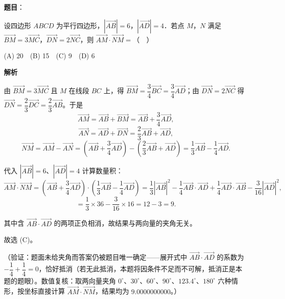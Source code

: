\begin{answer}

\textbf{题目}：

设四边形 \(ABCD\) 为平行四边形，\(\left|\overrightarrow{AB}\right|=6\)，\(\left|\overrightarrow{AD}\right|=4\)．若点 \(M\)，\(N\) 满足 \(\overrightarrow{BM}=3\overrightarrow{MC}\)，\(\overrightarrow{DN}=2\overrightarrow{NC}\)，则 \(\overrightarrow{AM}\cdot\overrightarrow{NM}=\)（　）

(A) 20　(B) 15　(C) 9　(D) 6

\textbf{解析}

由 \(\overrightarrow{BM}=3\overrightarrow{MC}\) 且 \(M\) 在线段 \(BC\) 上，得 \(\overrightarrow{BM}=\dfrac{3}{4}\overrightarrow{BC}=\dfrac{3}{4}\overrightarrow{AD}\)；由 \(\overrightarrow{DN}=2\overrightarrow{NC}\) 得 \(\overrightarrow{DN}=\dfrac{2}{3}\overrightarrow{DC}=\dfrac{2}{3}\overrightarrow{AB}\)。于是
\nopagebreak[4]
\[
\overrightarrow{AM}=\overrightarrow{AB}+\overrightarrow{BM}=\overrightarrow{AB}+\dfrac{3}{4}\overrightarrow{AD},
\]
\nopagebreak[4]
\[
\overrightarrow{AN}=\overrightarrow{AD}+\overrightarrow{DN}=\dfrac{2}{3}\overrightarrow{AB}+\overrightarrow{AD},
\]
\nopagebreak[4]
\[
\overrightarrow{NM}=\overrightarrow{AM}-\overrightarrow{AN}=\left(\overrightarrow{AB}+\dfrac{3}{4}\overrightarrow{AD}\right)-\left(\dfrac{2}{3}\overrightarrow{AB}+\overrightarrow{AD}\right)=\dfrac{1}{3}\overrightarrow{AB}-\dfrac{1}{4}\overrightarrow{AD}.
\]

代入 \(\left|\overrightarrow{AB}\right|=6\)、\(\left|\overrightarrow{AD}\right|=4\) 计算数量积：
\nopagebreak[4]
\[
\overrightarrow{AM}\cdot\overrightarrow{NM}=\left(\overrightarrow{AB}+\dfrac{3}{4}\overrightarrow{AD}\right)\cdot\left(\dfrac{1}{3}\overrightarrow{AB}-\dfrac{1}{4}\overrightarrow{AD}\right)=\dfrac{1}{3}\left|\overrightarrow{AB}\right|^2-\dfrac{1}{4}\overrightarrow{AB}\cdot\overrightarrow{AD}+\dfrac{1}{4}\overrightarrow{AD}\cdot\overrightarrow{AB}-\dfrac{3}{16}\left|\overrightarrow{AD}\right|^2,
\]
\nopagebreak[4]
\[
=\dfrac{1}{3}\times36-\dfrac{3}{16}\times16=12-3=9 .
\]

其中含 \(\overrightarrow{AB}\cdot\overrightarrow{AD}\) 的两项正负相消，故结果与两向量的夹角无关。

故选 (C)。

（验证：题面未给夹角而答案仍被题目唯一确定——展开式中 \(\overrightarrow{AB}\cdot\overrightarrow{AD}\) 的系数为 \(-\dfrac{1}{4}+\dfrac{1}{4}=0\)，恰好抵消（若无此抵消，本题将因条件不足而不可解，抵消正是本题的题眼）。数值复核：取两向量夹角 \(0^{\circ}\)、\(30^{\circ}\)、\(60^{\circ}\)、\(90^{\circ}\)、\(123.4^{\circ}\)、\(180^{\circ}\) 六种情形，按坐标直接计算 \(\overrightarrow{AM}\cdot\overrightarrow{NM}\)，结果均为 \(9.0000000000\)。）


\end{answer}
